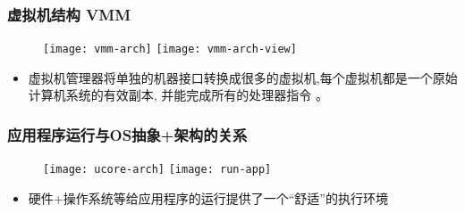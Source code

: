 \begin{frame}
	
	\frametitle{虚拟机结构 VMM}
	
	\begin{figure}
		\centering
		\texttt{[image: vmm-arch]} %
		\texttt{[image: vmm-arch-view]}
	\end{figure}

	\begin{itemize}
		\item 虚拟机管理器将单独的机器接口转换成很多的虚拟机,每个虚拟机都是一个原始计算机系统的有效副本, 并能完成所有的处理器指令 。
	\end{itemize}
	
\end{frame}
\begin{frame}
    
    \frametitle{应用程序运行与OS抽象+架构的关系}
    
    \begin{figure}
        \centering
        \texttt{[image: ucore-arch]} %
        \texttt{[image: run-app]}
    \end{figure}
    
    \begin{itemize}
        \item  硬件+操作系统等给应用程序的运行提供了一个“舒适”的执行环境
    \end{itemize}
    
\end{frame}

